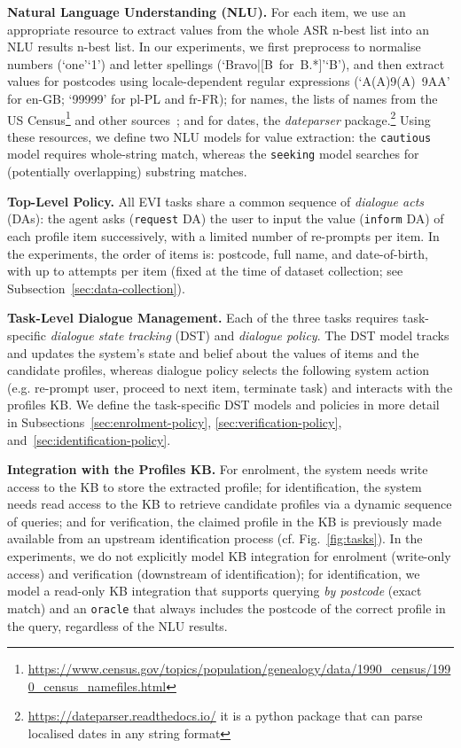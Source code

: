 \documentclass[11pt]{article}
\newcommand{\rparagraph}[1]{\vspace{1.4mm}\noindent\textbf{#1.}}
\begin{document}
{\rparagraph{Natural Language Understanding (NLU)}
For each item, we use an appropriate resource
to extract values from the whole ASR n-best list
into an NLU results n-best list.
In our experiments,
we first preprocess
to normalise numbers (`one'`1')
and letter spellings (`Bravo|[B~for~B.*]'`B'),
and then extract values
for postcodes
using
locale-dependent regular expressions
(`A(A)9(A)~9AA' for {en-GB}; `99999' for {pl-PL} and {fr-FR});
for names,
the lists of names from
the US Census\footnote{\url{ https://www.census.gov/topics/population/genealogy/data/1990_census/1990_census_namefiles.html}} and other sources~\cite{NameDataset2021};
and for {dates},
the \textit{dateparser} package.\footnote{\url{https://dateparser.readthedocs.io/} it is a python package that can parse localised dates in any string format}
Using these resources, we define two NLU models for value extraction:
the \texttt{cautious} model requires whole-string match,
whereas the \texttt{seeking} model searches for (potentially overlapping) substring matches.


\rparagraph{Top-Level Policy}
All EVI tasks share a common sequence of \textit{dialogue acts} (DAs):
the agent asks (\texttt{request} DA) the user
to input the value (\texttt{inform} DA) of each profile item successively,
with a limited number of re-prompts per item.
In the experiments,
the order of items is: postcode, full name, and date-of-birth,
with up to  attempts per item
(fixed at the time of dataset collection; see Subsection~\ref{sec:data-collection}).


\rparagraph{Task-Level Dialogue Management}
Each of the three tasks requires task-specific \textit{dialogue state tracking} (DST)
and \textit{dialogue policy}.
The DST model tracks and updates the system's state and belief about the values of items and the candidate profiles,
whereas dialogue policy selects the following system action
(e.g. re-prompt user, proceed to next item, terminate task)
and interacts with the profiles KB.
We define the task-specific DST models and policies in more detail
in Subsections~\ref{sec:enrolment-policy}, \ref{sec:verification-policy}, and~\ref{sec:identification-policy}.

\rparagraph{Integration with the Profiles KB}
For enrolment,
the system needs write access to the KB to store the extracted profile; for identification, the system needs read access to the KB to retrieve candidate profiles via a dynamic sequence of queries;
and for verification,
the claimed profile in the KB is previously made available from an upstream identification process (cf. Fig.~\ref{fig:tasks}).
In the experiments,
we do not explicitly model KB integration for enrolment (write-only access) and verification (downstream of identification);
for identification, we model a read-only KB integration
that supports querying \textit{by postcode} (exact match)
and an \texttt{oracle} that always includes the postcode of the correct profile in the query, regardless of the NLU results.

}
\end{document}
